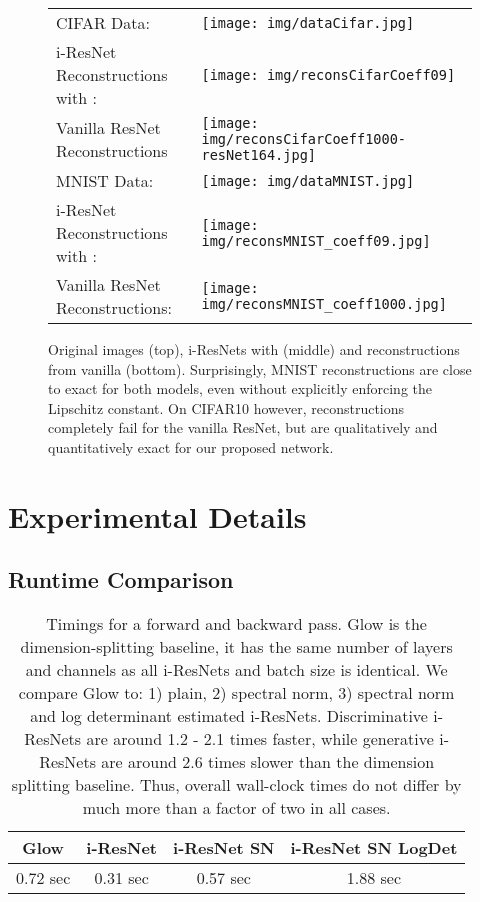 \documentclass{article}
\begin{document}
\begin{figure}[H]
\begin{tabular}{R{3.9cm}L{9cm}}{CIFAR Data:}&
\texttt{[image: img/dataCifar.jpg]}\\
{i-ResNet Reconstructions with :}&
\texttt{[image: img/reconsCifarCoeff09]}\\
{Vanilla ResNet Reconstructions}&
    \texttt{[image: img/reconsCifarCoeff1000-resNet164.jpg]}\\\midrule
{MNIST Data:}&
\texttt{[image: img/dataMNIST.jpg]}\\
{i-ResNet Reconstructions with :}&
\texttt{[image: img/reconsMNIST\_coeff09.jpg]} \\
{Vanilla ResNet Reconstructions:}&
\texttt{[image: img/reconsMNIST\_coeff1000.jpg]}\end{tabular}
    \caption{Original images (top), i-ResNets with  (middle) and reconstructions from vanilla (bottom). Surprisingly, MNIST reconstructions are close to exact for both models, even without explicitly enforcing the Lipschitz constant. On CIFAR10 however, reconstructions completely fail for the vanilla ResNet, but are qualitatively and quantitatively exact for our proposed network. }
    \label{fig:reconstruction}
\end{figure}

\section{Experimental Details}

\subsection{Runtime Comparison}
\label{sec:runtime}
\begin{table}[h!]
\begin{center}
\begin{tabular}{S|SSS} \toprule
      {Glow}& {i-ResNet}  & {i-ResNet SN} & {i-ResNet SN LogDet} \\ 
      \midrule
    {0.72 sec} & {0.31 sec}  & {0.57 sec}  &{1.88 sec} 
\end{tabular}
\caption{Timings for a forward and backward pass. Glow is the dimension-splitting baseline, it has the same number of layers and channels as all i-ResNets and batch size is identical. We compare Glow to: 1) plain, 2) spectral norm, 3) spectral norm and log determinant estimated i-ResNets. Discriminative i-ResNets are around 1.2 - 2.1 times faster, while generative i-ResNets are around 2.6 times slower than the dimension splitting baseline. Thus, overall wall-clock times do not differ by much more than a factor of two in all cases.}
\label{tab:runtimeComp}
\end{center}
\end{table}
\end{document}
